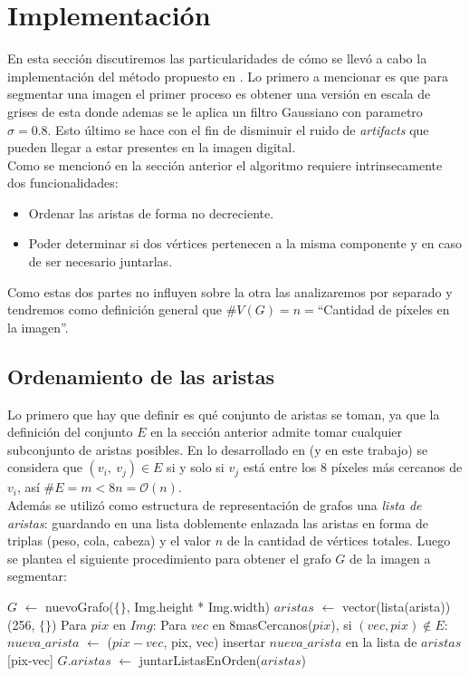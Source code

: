 \section{Implementaci\'on}
En esta secci\'on discutiremos las particularidades de cómo se llev\'o a cabo la implementaci\'on del m\'etodo propuesto en \cite{Felzenszwalb2004}. Lo primero a mencionar es que para segmentar una imagen el primer proceso es obtener una versi\'on en escala de grises de esta donde ademas se le aplica un filtro Gaussiano con parametro $\sigma=0.8$. Esto último se hace con el fin de disminuir el ruido de \textit{artifacts} que pueden llegar a estar presentes en la imagen digital. \\
\indent Como se mencion\'o en la secci\'on anterior el algoritmo requiere intrinsecamente dos funcionalidades:
\begin{itemize}
	\item Ordenar las aristas de forma no decreciente.
	\item Poder determinar si dos vértices pertenecen a la misma componente y en caso de ser necesario juntarlas.
\end{itemize}

\indent Como estas dos partes no influyen sobre la otra las analizaremos por separado y tendremos como definici\'on general que $\#V(G)=n=$``Cantidad de píxeles en la imagen''.

\subsection{Ordenamiento de las aristas}
Lo primero que hay que definir es qué conjunto de aristas se toman, ya que la definici\'on del conjunto $E$ en la secci\'on anterior admite tomar cualquier subconjunto de aristas posibles. En lo desarrollado en \cite{Felzenszwalb2004} (y en este trabajo) se considera que $(v_i,\ v_j)\in E$ si y solo si $v_j$ est\'a entre los 8 píxeles m\'as cercanos de $v_i$, as\'i $\#E=m<8n=\mathcal{O}(n)$. \\
\indent Adem\'as se utiliz\'o como estructura de representaci\'on de grafos una \textit{lista de aristas}: guardando en una lista doblemente enlazada las aristas en forma de triplas (peso, cola, cabeza) y el valor $n$ de la cantidad de vértices totales. Luego se plantea el siguiente procedimiento para obtener el grafo $G$ de la imagen a segmentar:

\begin{algorithm}
\caption{Imagen a lista de aristas ordenadas por peso}
\label{img2sorted}
\begin{algorithmic}[1]
\State $G$ $\gets$ nuevoGrafo($\{\}$, Img.height * Img.width)
\State $aristas$ $\gets$ vector(lista(arista)) (256, $\{\}$)
\State Para $pix$ en $Img$:
\State \indent 	Para $vec$ en 8masCercanos($pix$), si $(vec,pix)\notin E$:
\State \indent	\indent 	$nueva\_arista$ $\gets$ ($pix-vec$, pix, vec)
\State 			insertar $nueva\_arista$ en la lista de $aristas$[pix-vec]
\State $G.aristas$ $\gets$ juntarListasEnOrden($aristas$) 
\EndProcedure
\end{algorithmic}
\end{algorithm}

